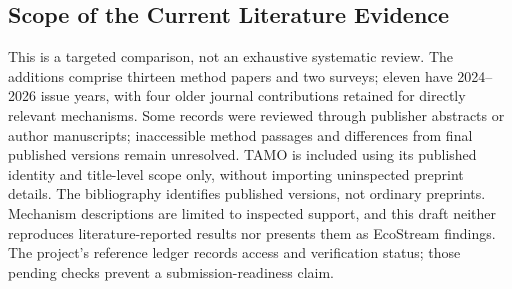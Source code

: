 \subsection{Scope of the Current Literature Evidence}
This is a targeted comparison, not an exhaustive systematic review. The additions comprise thirteen method papers and two surveys; eleven have 2024--2026 issue years, with four older journal contributions retained for directly relevant mechanisms. Some records were reviewed through publisher abstracts or author manuscripts; inaccessible method passages and differences from final published versions remain unresolved. TAMO is included using its published identity and title-level scope only, without importing uninspected preprint details. The bibliography identifies published versions, not ordinary preprints. Mechanism descriptions are limited to inspected support, and this draft neither reproduces literature-reported results nor presents them as EcoStream findings. The project's reference ledger records access and verification status; those pending checks prevent a submission-readiness claim.
